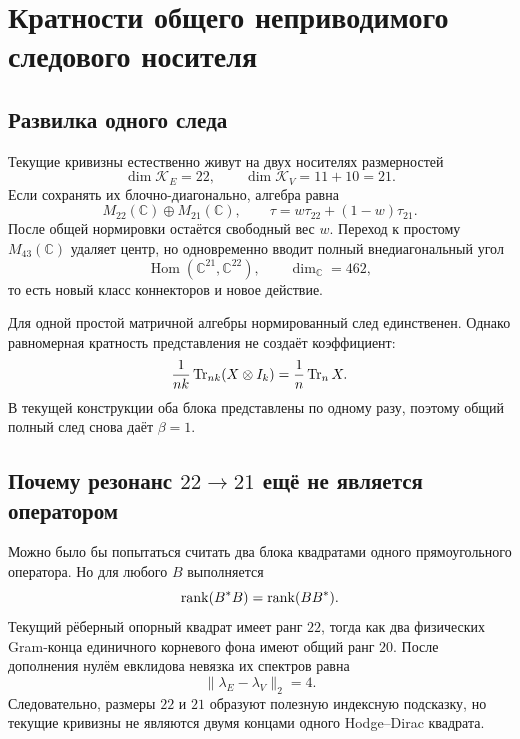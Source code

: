 \chapter{Кратности общего неприводимого следового носителя}
\label{ch:v7-common-irreducible-trace-multiplicity-gate}

\section{Развилка одного следа}

Текущие кривизны естественно живут на двух носителях размерностей
\begin{equation}
 \dim\mathcal K_E=22,
 \qquad
 \dim\mathcal K_V=11+10=21.
 \label{eq:v7-common-trace-carrier-dimensions}
\end{equation}
Если сохранять их блочно-диагонально, алгебра равна
\begin{equation}
 M_{22}(\mathbb C)\oplus M_{21}(\mathbb C),
 \qquad
 \tau=w\tau_{22}+(1-w)\tau_{21}.
 \label{eq:v7-common-trace-central-fork}
\end{equation}
После общей нормировки остаётся свободный вес $w$. Переход к простому
$M_{43}(\mathbb C)$ удаляет центр, но одновременно вводит полный
внедиагональный угол
\begin{equation}
 \operatorname{Hom}(\mathbb C^{21},\mathbb C^{22}),
 \qquad \dim_{\mathbb C}=462,
 \label{eq:v7-common-trace-offdiagonal-cost}
\end{equation}
то есть новый класс коннекторов и новое действие.

Для одной простой матричной алгебры нормированный след единственен. Однако
равномерная кратность представления не создаёт коэффициент:
\begin{equation}
 \frac1{nk}\operatorname{Tr}_{nk}(X\otimes I_k)=\frac1n\operatorname{Tr}_nX.
 \label{eq:v7-common-trace-multiplicity-cancellation}
\end{equation}
В текущей конструкции оба блока представлены по одному разу, поэтому общий
полный след снова даёт $\beta=1$.

\section{Почему резонанс \texorpdfstring{$22\to21$}{22 -> 21} ещё не является оператором}

Можно было бы попытаться считать два блока квадратами одного прямоугольного
оператора. Но для любого $B$ выполняется
\begin{equation}
 \operatorname{rank}(B^*B)=\operatorname{rank}(BB^*).
 \label{eq:v7-common-trace-rank-pairing}
\end{equation}
Текущий рёберный опорный квадрат имеет ранг $22$, тогда как два физических
Gram-конца единичного корневого фона имеют общий ранг $20$. После дополнения
нулём евклидова невязка их спектров равна
\begin{equation}
 \|\lambda_E-\lambda_V\|_2=4.
 \label{eq:v7-common-trace-spectral-mismatch}
\end{equation}
Следовательно, размеры $22$ и $21$ образуют полезную индексную подсказку, но
текущие кривизны не являются двумя концами одного Hodge--Dirac квадрата.

